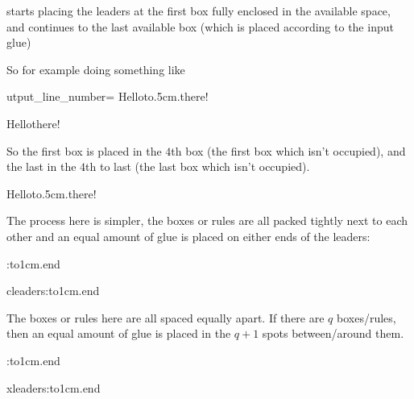 {{        \macroname\leaders{} starts placing the leaders at the first box fully enclosed in the available space, and continues to
        the last available box (which is placed according to the input glue)

        So for example doing something like

{\let\_output_line_number=\@gobble
\beginhi
Hello\leaders\hbox to.5cm{\hss.\hss}\hfill there!
\endhi
}

        \quitvmode
        Hello\hfill there!

        So the first box is placed in the $4$th box (the first box which isn't occupied), and the last in the $4$th to last (the
        last box which isn't occupied).

        \quitvmode
        Hello\leaders\hbox to.5cm{\hss.\hss}\hfill there!
    \endtextbox

\endslide

\beginslide
    \bheadline

    \textbox{}
        \centerline{\color{white}\macroname\cleaders}
    \endtextbox

    \textbox\empty{4.5cm}{\lastoy}{\hsize-5.5cm}{}
        The process here is simpler, the boxes or rules are all packed tightly next to each other and an equal amount of glue is
        placed on either ends of the leaders:

        \quitvmode{}\hphantom{cleaders}:\leaders\hbox to1cm{\hss.\hss}\hfill end

        cleaders:\cleaders\hbox to1cm{\hss.\hss}\hfill end
    \endtextbox

    \textbox{}
        \centerline{\color{white}\macroname\xleaders}
    \endtextbox

    \textbox\empty{4.5cm}{\lastoy}{\hsize-5.5cm}{}
        The boxes or rules here are all spaced equally apart.
        If there are $q$ boxes/rules, then an equal amount of glue is placed in the $q+1$ spots between/around them.

        \quitvmode{}\hphantom{xleaders}:\leaders\hbox to1cm{\hss.\hss}\hfill end

        xleaders:\xleaders\hbox to1cm{\hss.\hss}\hfill end
    \endtextbox

}}
